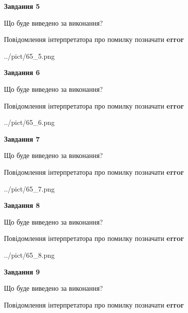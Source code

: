 \documentclass[11pt, ukrainian]{article}
\begin{document}
{\begin {large}
{\begin {center}\textbf{Завдання 5}\end {center}}\par
Що буде виведено за виконання? \par
Повідомлення інтерпретатора про помилку позначати \textbf{error}

\begin{center}
	{../pict/65_5.png}
\end{center}
\newpage

{\begin {center}\textbf{Завдання 6}\end {center}}\par
Що буде виведено за виконання? \par
Повідомлення інтерпретатора про помилку позначати \textbf{error}

\begin{center}
	{../pict/65_6.png}
\end{center}
\newpage

{\begin {center}\textbf{Завдання 7}\end {center}}\par
Що буде виведено за виконання? \par
Повідомлення інтерпретатора про помилку позначати \textbf{error}

\begin{center}
	{../pict/65_7.png}
\end{center}
\newpage

{\begin {center}\textbf{Завдання 8}\end {center}}\par
Що буде виведено за виконання? \par
Повідомлення інтерпретатора про помилку позначати \textbf{error}

\begin{center}
	{../pict/65_8.png}
\end{center}
\newpage

{\begin {center}\textbf{Завдання 9}\end {center}}\par
Що буде виведено за виконання? \par
Повідомлення інтерпретатора про помилку позначати \textbf{error}


\end{large}}
\end{document}
